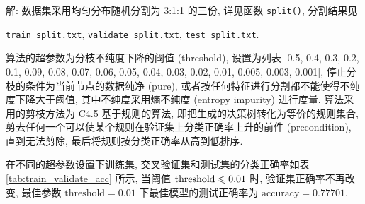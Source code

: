 \documentclass{article}
\begin{document}
解: 数据集采用均匀分布随机分割为 3:1:1 的三份, 详见函数 \verb|split()|, 分割结果见 

\hspace{4cm}\verb|train_split.txt|, \verb|validate_split.txt|, \verb|test_split.txt|.

算法的超参数为分枝不纯度下降的阈值 (threshold), 设置为列表 [0.5, 0.4, 0.3, 0.2, 0.1, 0.09, 0.08, 0.07, 0.06, 0.05, 0.04, 0.03, 0.02, 0.01, 0.005, 0.003, 0.001], 停止分枝的条件为当前节点的数据纯净 (pure), 或者按任何特征进行分割都不能使得不纯度下降大于阈值, 其中不纯度采用熵不纯度 (entropy impurity) 进行度量. 算法采用的剪枝方法为 C4.5 基于规则的算法, 即把生成的决策树转化为等价的规则集合, 剪去任何一个可以使某个规则在验证集上分类正确率上升的前件 (precondition), 直到无法剪除, 最后将规则按分类正确率从高到低排序.

在不同的超参数设置下训练集, 交叉验证集和测试集的分类正确率如表 \ref{tab:train_validate_acc} 所示, 当阈值 $\text{threshold}\leqslant0.01$ 时, 验证集正确率不再改变, 最佳参数 $\text{threshold}=0.01$ 下最佳模型的测试正确率为 $\text{accuracy}=0.77701$.
\end{document}
